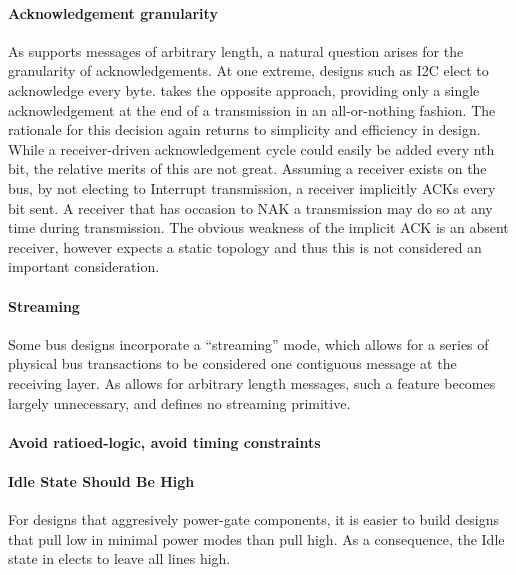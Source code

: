 \paragraph{Acknowledgement granularity}
As \bus supports messages of arbitrary length, a natural question arises for
the granularity of acknowledgements. At one extreme, designs such as I2C elect
to acknowledge every byte. \bus takes the opposite approach, providing only a
single acknowledgement at the end of a transmission in an all-or-nothing
fashion. The rationale for this decision again returns to simplicity and
efficiency in design. While a receiver-driven acknowledgement cycle could
easily be added every nth bit, the relative merits of this are not great.
Assuming a receiver exists on the bus, by not electing to Interrupt
transmission, a receiver implicitly ACKs every bit sent. A receiver that has
occasion to NAK a transmission may do so at any time during transmission. The
obvious weakness of the implicit ACK is an absent receiver, however \bus
expects a static topology and thus this is not considered an important
consideration.

\paragraph{Streaming}
Some bus designs incorporate a ``streaming'' mode, which allows for a series
of physical bus transactions to be considered one contiguous message at the
receiving layer. As \bus allows for arbitrary length messages, such a feature
becomes largely unnecessary, and \bus defines no streaming primitive.

\paragraph{Avoid ratioed-logic, avoid timing constraints}

\paragraph{Idle State Should Be High}
For designs that aggresively power-gate components, it is easier to build
designs that pull low in minimal power modes than pull high. As a consequence,
the Idle state in \bus elects to leave all lines high.

